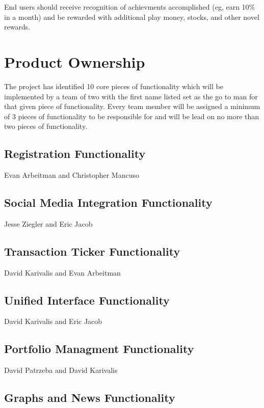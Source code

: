 \documentclass[11pt,letterpaper,oneside]{memoir}
\begin{document}
End users should receive recognition of achievments accomplished (eg, earn 10\% in a month) and
be rewarded with additional play money, stocks, and other novel rewards.

\chapter{Product Ownership}
The project has identified 10 core pieces of functionality which will be implemented by a team of two
with the first name listed set as the go to man for that given piece of functionality.  Every team
member will be assigned a minimum of 3 pieces of functionality to be responsible for and will be
lead on no more than two pieces of functionality.

\section{Registration Functionality}

Evan Arbeitman and Christopher Mancuso

\section{Social Media Integration Functionality}

Jesse Ziegler and Eric Jacob

\section{Transaction Ticker Functionality}

David Karivalis and Evan Arbeitman

\section{Unified Interface Functionality}

David Karivalis and Eric Jacob

\section{Portfolio Managment Functionality}

David Patrzeba and David Karivalis

\section{Graphs and News Functionality}
\end{document}
